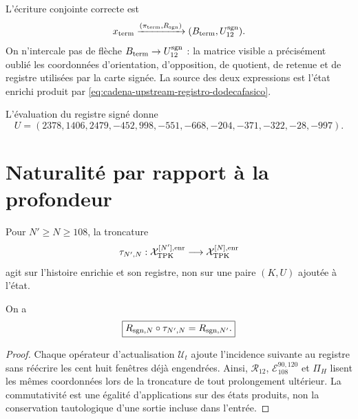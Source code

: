 L’écriture conjointe correcte est
\begin{equation}
 x_{\rm term}
 \xrightarrow{(\pi_{\rm term},R_{\rm sgn})}
 (B_{\rm term},U_{12}^{\rm sgn}).
 \label{eq:doble-publicacion-terminal}
\end{equation}
On n'intercale pas de flèche \(B_{\rm term}\to U_{12}^{\rm sgn}\) : la matrice visible a précisément oublié les coordonnées d'orientation, d'opposition, de quotient, de retenue et de registre utilisées par la carte signée. La source des deux expressions est l'état enrichi produit par \eqref{eq:cadena-upstream-registro-dodecafasico}.

L’évaluation du registre signé donne
\begin{equation}
 \boxed{
 U=(2378,1406,2479,-452,998,-551,
 -668,-204,-371,-322,-28,-997).}
 \label{eq:vector-u-firmado-autonomo}
\end{equation}

\section{Naturalité par rapport à la profondeur}

Pour \(N'\geq N\geq108\), la troncature
\begin{equation}
 \tau_{N',N}:
 \mathcal X_{\rm TPK}^{[N'],\rm enr}
 \longrightarrow\mathcal X_{\rm TPK}^{[N],\rm enr}
 \label{eq:truncamiento-preserva-ku-autonomo}
\end{equation}
agit sur l'histoire enrichie et son registre, non sur une paire \((K,U)\) ajoutée à l'état.

\begin{theorem}
\label{thm:naturalidad-lector-firmado-autonomo}
On a
\begin{equation}
 \boxed{
 R_{{\rm sgn},N}\circ\tau_{N',N}
 =R_{{\rm sgn},N'}.}
 \label{eq:cuadrado-naturalidad-lector-firmado}
\end{equation}
\end{theorem}

\begin{proof}
Chaque opérateur d'actualisation \(\mathcal U_t\) ajoute l'incidence suivante au registre sans réécrire les cent huit fenêtres déjà engendrées. Ainsi, \(\mathcal R_{12}\), \(\mathcal E_{108}^{90,120}\) et \(\Pi_H\) lisent les mêmes coordonnées lors de la troncature de tout prolongement ultérieur. La commutativité est une égalité d'applications sur des états produits, non la conservation tautologique d'une sortie incluse dans l'entrée.
\end{proof}


